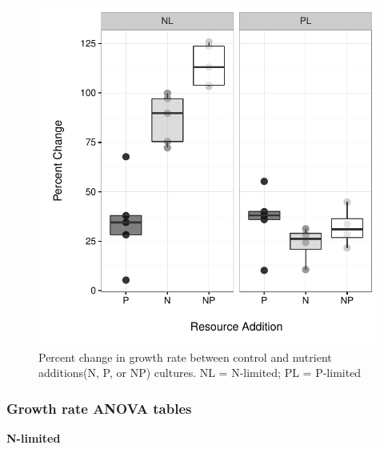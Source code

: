\documentclass[]{article}
\begin{document}
\begin{figure}[htbp]
\centering
\includegraphics{analysis_ecoevostoich_files/figure-latex/perc.change-1.pdf}
\caption{Percent change in growth rate between control and nutrient
additions(N, P, or NP) cultures. NL = N-limited; PL = P-limited}
\end{figure}

\newpage

\subsubsection{Growth rate ANOVA
tables}\label{growth-rate-anova-tables-1}

\textbf{N-limited}
\end{document}
